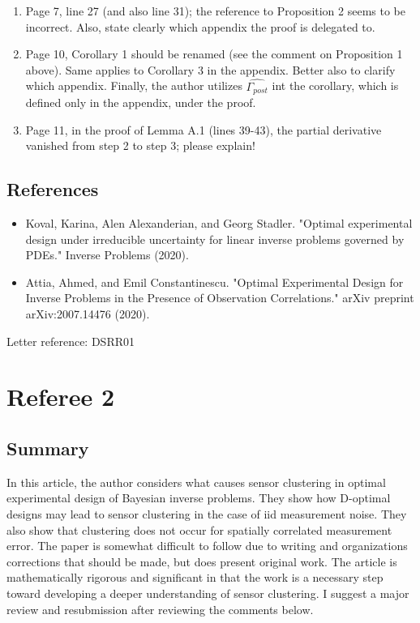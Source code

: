 \documentclass{amsart}
\numberwithin{equation}{section}
\begin{document}
\begin{enumerate}
  \item Page 7, line 27 (and also line 31); the reference to Proposition 2
    seems to be incorrect. Also, state clearly which appendix the proof is
    delegated to.
    
  \item Page 10, Corollary 1 should be renamed (see the comment on
    Proposition 1 above). Same applies to Corollary 3 in the
    appendix. Better also to clarify which appendix. Finally, the
    author utilizes $\widehat{\Gamma_{post}}$ int the corollary,
    which is defined only in the appendix, under the proof.

  \item Page 11, in the proof of Lemma A.1 (lines 39-43), the partial
    derivative vanished from step 2 to step 3; please explain!
    
\end{enumerate}
\subsection{References}

\begin{itemize}
\item Koval, Karina, Alen Alexanderian, and Georg Stadler. "Optimal
  experimental design under irreducible uncertainty for linear inverse
  problems governed by PDEs." Inverse Problems (2020).
  
\item Attia, Ahmed, and Emil Constantinescu. "Optimal Experimental
  Design for Inverse Problems in the Presence of Observation
  Correlations." arXiv preprint arXiv:2007.14476 (2020).
\end{itemize}
  
Letter reference: DSRR01


\section{Referee 2}

\subsection{Summary}

In this article, the author considers what causes sensor clustering in
optimal experimental design of Bayesian inverse problems. They show
how D-optimal designs may lead to sensor clustering in the case of iid
measurement noise. They also show that clustering does not occur for
spatially correlated measurement error. The paper is somewhat
difficult to follow due to writing and organizations corrections that
should be made, but does present original work. The article is
mathematically rigorous and significant in that the work is a
necessary step toward developing a deeper understanding of sensor
clustering. I suggest a major review and resubmission after reviewing
the comments below.
\end{document}
